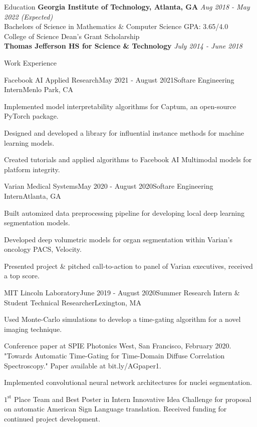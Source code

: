 \documentclass{template} %
\begin{document}

\begin{rSection}{Education}
{\bf Georgia Institute of Technology, Atlanta, GA} \hfill {\em Aug 2018 - May 2022 (Expected)}
\\ Bachelors of Science in Mathematics \& Computer Science \hfill  GPA: 3.65/4.0 
\\ College of Science Dean's Grant Scholarship \medskip
\\ {\bf Thomas Jefferson HS for Science \& Technology} \hfill {\em July 2014 - June 2018}
\end{rSection}


\begin{rSection}{Work Experience}

\begin{rSubsection}{Facebook AI Applied Research}{May 2021 - August 2021}{Softare Engineering Intern}{Menlo Park, CA}
\item Implemented model interpretability algorithms for Captum, an open-source PyTorch package.
\item Designed and developed a library for influential instance methods for machine learning models.
\item Created tutorials and applied algorithms to Facebook AI Multimodal models for platform integrity. 
\end{rSubsection}

\begin{rSubsection}{Varian Medical Systems}{May 2020 - August 2020}{Softare Engineering Intern}{Atlanta, GA}
\item Built automized data preprocessing pipeline for developing local deep learning segmentation models.
\item Developed deep volumetric models for organ segmentation within Varian's oncology PACS, Velocity.
\item Presented project \& pitched call-to-action to panel of Varian executives, received a top score.
\end{rSubsection}

\begin{rSubsection}{MIT Lincoln Laboratory}{June 2019 - August 2020}{Summer Research Intern \& Student Technical Researcher}{Lexington, MA}
\item Used Monte-Carlo simulations to develop a time-gating algorithm for a novel imaging technique.
\item Conference paper at SPIE Photonics West, San Francisco, February 2020. "Towards Automatic Time-Gating for Time-Domain Diffuse Correlation Spectroscopy." Paper available at bit.ly/AGpaper1.
\item Implemented convolutional neural network architectures for nuclei segmentation.
\item$1^{\text{st}}$ Place Team and Best Poster in Intern Innovative Idea Challenge for proposal on automatic American Sign Language translation. Received funding for continued project development.
\end{rSubsection}

\end{rSection}
\vspace{-2mm}
\end{document}
